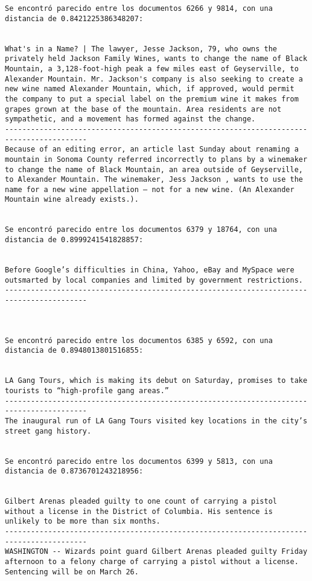 \documentclass[11pt]{article}
\begin{document}
\begin{Verbatim}[commandchars=\\\{\}]
Se encontró parecido entre los documentos 6266 y 9814, con una distancia de 0.8421225386348207:


What's in a Name? | The lawyer, Jesse Jackson, 79, who owns the privately held Jackson Family Wines, wants to change the name of Black Mountain, a 3,128-foot-high peak a few miles east of Geyserville, to Alexander Mountain. Mr. Jackson's company is also seeking to create a new wine named Alexander Mountain, which, if approved, would permit the company to put a special label on the premium wine it makes from grapes grown at the base of the mountain. Area residents are not sympathetic, and a movement has formed against the change.
-----------------------------------------------------------------------------------------
Because of an editing error, an article last Sunday about renaming a mountain in Sonoma County referred incorrectly to plans by a winemaker to change the name of Black Mountain, an area outside of Geyserville, to Alexander Mountain. The winemaker, Jess Jackson , wants to use the name for a new wine appellation — not for a new wine. (An Alexander Mountain wine already exists.).


Se encontró parecido entre los documentos 6379 y 18764, con una distancia de 0.8999241541828857:


Before Google’s difficulties in China, Yahoo, eBay and MySpace were outsmarted by local companies and limited by government restrictions.
-----------------------------------------------------------------------------------------



Se encontró parecido entre los documentos 6385 y 6592, con una distancia de 0.8948013801516855:


LA Gang Tours, which is making its debut on Saturday, promises to take tourists to “high-profile gang areas.”
-----------------------------------------------------------------------------------------
The inaugural run of LA Gang Tours visited key locations in the city’s street gang history.


Se encontró parecido entre los documentos 6399 y 5813, con una distancia de 0.8736701243218956:


Gilbert Arenas pleaded guilty to one count of carrying a pistol without a license in the District of Columbia. His sentence is unlikely to be more than six months.
-----------------------------------------------------------------------------------------
WASHINGTON -- Wizards point guard Gilbert Arenas pleaded guilty Friday afternoon to a felony charge of carrying a pistol without a license. Sentencing will be on March 26.



\end{Verbatim}
\end{document}
